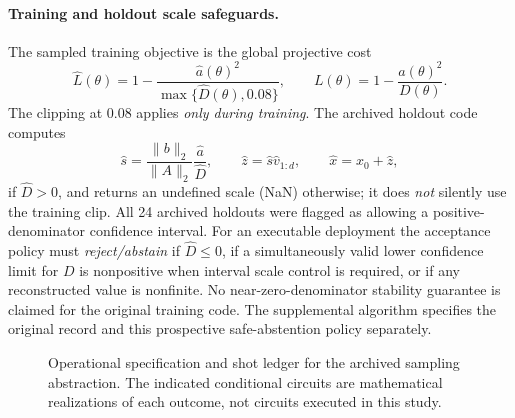 \documentclass[11pt,a4paper]{article}
\theoremstyle{remark}\newtheorem{remark}[theorem]{Remark}
\begin{document}
\paragraph{Training and holdout scale safeguards.} The sampled training objective is the global projective cost
\begin{equation}\label{eq:traincost}
 \widehat L(\theta)=1-\frac{\widehat a(\theta)^2}{\max\{\widehat D(\theta),0.08\}},\qquad
 L(\theta)=1-\frac{a(\theta)^2}{D(\theta)}.
\end{equation}
The clipping at $0.08$ applies \emph{only during training}. The archived holdout code computes
\begin{equation}\label{eq:zreconstruct}
 \widehat s=\frac{\|b\|_2}{\|A\|_2}\frac{\widehat a}{\widehat D},\qquad \widehat z=\widehat s\widehat v_{1:d},\qquad \widehat x=x_0+\widehat z,
\end{equation}
if $\widehat D>0$, and returns an undefined scale (NaN) otherwise; it does \emph{not} silently use the training clip. All 24 archived holdouts were flagged as allowing a positive-denominator confidence interval. For an executable deployment the acceptance policy must \emph{reject/abstain} if $\widehat D\le0$, if a simultaneously valid lower confidence limit for $D$ is nonpositive when interval scale control is required, or if any reconstructed value is nonfinite. No near-zero-denominator stability guarantee is claimed for the original training code. The supplemental algorithm specifies the original record and this prospective safe-abstention policy separately.

\begin{figure}[htbp]\centering
{}
\caption{Operational specification and shot ledger for the archived sampling abstraction. The indicated conditional circuits are mathematical realizations of each outcome, not circuits executed in this study.}\label{fig:oraclealgorithm}
\end{figure}
\end{document}
